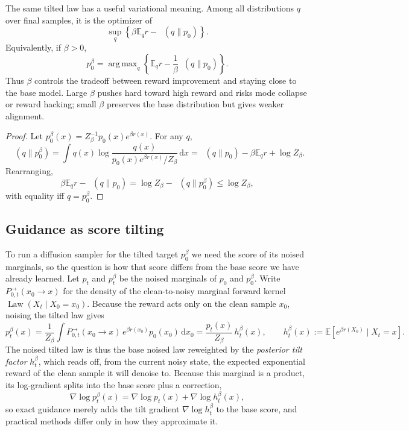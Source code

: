 \documentclass{amsart}
\numberwithin{equation}{section}
\theoremstyle{plain}
\theoremstyle{definition}
\theoremstyle{remark}
\DeclareMathOperator{\KL}{D_{\mathsf{KL}}}
\DeclareMathOperator{\Law}{Law}
\DeclareMathOperator{\argmax}{arg\,max}
\newcommand{\E}{\mathbb{E}}
\newcommand{\dd}{\,\mathrm{d}}
\begin{document}
The same tilted law has a useful variational meaning.  Among all distributions
$q$ over final samples, it is the optimizer of
\begin{equation}\label{eq:gibbs-variational}
    \sup_q
    \left\{
    \beta\E_q r-\KL(q\|p_0)
    \right\}.
\end{equation}
Equivalently, if $\beta>0$,
\[
    p_0^\beta
    =
    \argmax_q
    \left\{
    \E_q r-\frac1\beta\KL(q\|p_0)
    \right\}.
\]
Thus $\beta$ controls the tradeoff between
reward improvement and staying close to the base model.  Large $\beta$ pushes
hard toward high reward and risks mode collapse or reward hacking; small
$\beta$ preserves the base distribution but gives weaker alignment.

\begin{proof}
Let $p_0^\beta(x)=Z_\beta^{-1}p_0(x)e^{\beta r(x)}$.  For any $q$,
\[
    \KL(q\|p_0^\beta)
    =
    \int q(x)\log\frac{q(x)}{p_0(x)e^{\beta r(x)}/Z_\beta}\dd x
    =
    \KL(q\|p_0)-\beta\E_q r+\log Z_\beta.
\]
Rearranging,
\[
    \beta\E_q r-\KL(q\|p_0)
    =
    \log Z_\beta-\KL(q\|p_0^\beta)
    \leq \log Z_\beta,
\]
with equality iff $q=p_0^\beta$.
\end{proof}

\subsection{Guidance as score tilting}
\label{subsec:guidance-score}

To run a diffusion sampler for the tilted target $p_0^\beta$ we need the score of
its noised marginals, so the question is how that score differs from the base
score we have already learned.  Let $p_t$ and $p_t^\beta$ be the noised marginals
of $p_0$ and $p_0^\beta$.  Write $P_{0,t}^{\to}(x_0\to x)$ for the density of
the clean-to-noisy marginal forward kernel $\Law(X_t\mid X_0=x_0)$.  Because the reward acts only on the clean
sample $x_0$, noising the tilted law gives
\[
    p_t^\beta(x)
    =
    \frac{1}{Z_\beta}\int P_{0,t}^{\to}(x_0\to x)\,
    e^{\beta r(x_0)}p_0(x_0)\dd x_0
    =
    \frac{p_t(x)}{Z_\beta}\,h_t^\beta(x),
    \qquad
    h_t^\beta(x):=\E\!\left[e^{\beta r(X_0)}\mid X_t=x\right].
\]
The noised tilted law is thus the base noised law reweighted by the
\emph{posterior tilt factor} $h_t^\beta$, which reads off, from the current noisy
state, the expected exponential reward of the clean sample it will denoise to.
Because this marginal is a product, its log-gradient splits into the base score
plus a correction,
\[
    \nabla\log p_t^\beta(x)
    =
    \nabla\log p_t(x)+\nabla\log h_t^\beta(x),
\]
so exact guidance merely adds the tilt gradient $\nabla\log h_t^\beta$ to the
base score, and practical methods differ only in how they approximate it.
\end{document}

